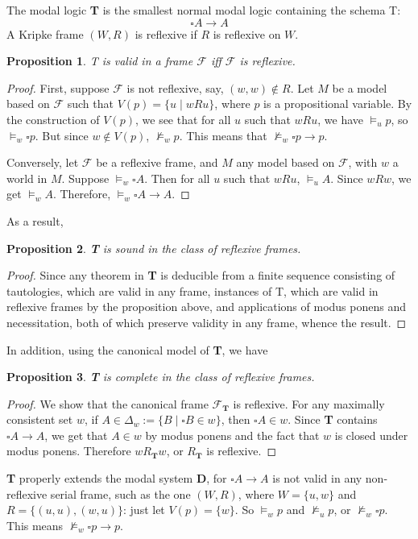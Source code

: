 \documentclass[12pt]{article}
\newtheorem{prop}{Proposition}
\begin{document}
The modal logic \textbf{T} is the smallest normal modal logic containing the schema T:
$$\square A \to A$$
A Kripke frame $(W,R)$ is reflexive if $R$ is reflexive on $W$.

\begin{prop} T is valid in a frame $\mathcal{F}$ iff $\mathcal{F}$ is reflexive. \end{prop}
\begin{proof}  First, suppose $\mathcal{F}$ is not reflexive, say, $(w,w)\notin R$.  Let $M$ be a model based on $\mathcal{F}$ such that $V(p)=\lbrace u\mid w R u \rbrace$, where $p$ is a propositional variable.  By the construction of $V(p)$, we see that for all $u$ such that $w R u$, we have $\models_u p$, so $\models_w \square p$.  But since $w\notin V(p)$, $\not \models_w p$.  This means that $\not \models_w \square p \to p$.

Conversely, let $\mathcal{F}$ be a reflexive frame, and $M$ any model based on $\mathcal{F}$, with $w$ a world in $M$.  Suppose $\models_w \square A$.  Then for all $u$ such that $w R u$, $\models_u A$.  Since $w R w$, we get $\models_w A$.  Therefore, $\models_w \square A \to A$.
\end{proof}

As a result,
\begin{prop} \textbf{T} is sound in the class of reflexive frames. \end{prop}
\begin{proof}  Since any theorem in \textbf{T} is deducible from a finite sequence consisting of tautologies, which are valid in any frame, instances of T, which are valid in reflexive frames by the proposition above, and applications of modus ponens and necessitation, both of which preserve validity in any frame, whence the result.
\end{proof}

In addition, using the canonical model of \textbf{T}, we have
\begin{prop} \textbf{T} is complete in the class of reflexive frames. \end{prop}
\begin{proof}  We show that the canonical frame $\mathcal{F}_{\textbf{T}}$ is reflexive.  For any maximally consistent set $w$, if $A \in \Delta_w:=\lbrace B\mid \square B\in w\rbrace$, then $\square A \in w$.  Since \textbf{T} contains $\square A\to A$, we get that $A\in w$ by modus ponens and the fact that $w$ is closed under modus ponens.  Therefore $w R_{\textbf{T}} w$, or $R_{\textbf{T}}$ is reflexive.
\end{proof}

\textbf{T} properly extends the modal system \textbf{D}, for $\square A \to A$ is not valid in any non-reflexive serial frame, such as the one $(W,R)$, where $W=\lbrace u,w\rbrace$ and $R=\lbrace (u,u),(w,u)\rbrace$: just let $V(p)=\lbrace w \rbrace$.  So $\models_w p$ and $\not \models_u p$, or $\not \models_w \square p$.  This means $\not \models_w \square p \to p$.

\end{document}
